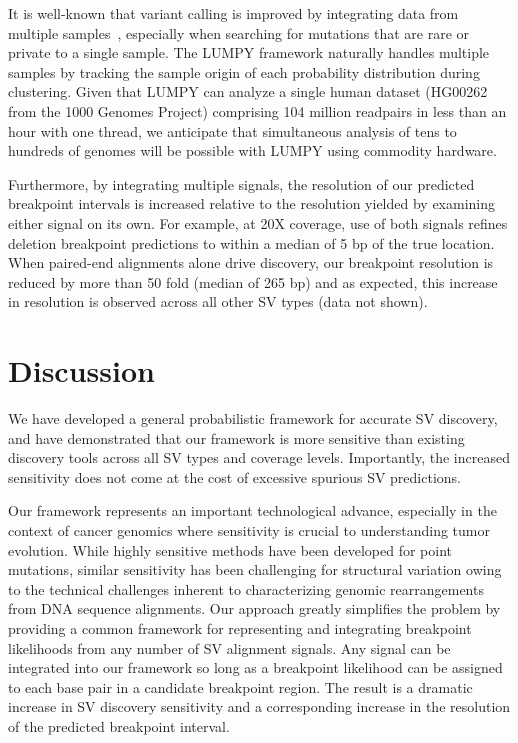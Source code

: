\documentclass[10pt]{bmc_article}
\newenvironment{bmcformat}{\begin{raggedright}\baselineskip20pt\sloppy\setboolean{publ}{false}}{\end{raggedright}\baselineskip20pt\sloppy}
\begin{document}
\begin{bmcformat}
It is well-known that variant calling is improved by integrating data from
multiple samples~\cite{handsaker2011, mckenna2010, hormozdiari2011,
quinlan2011}, especially when searching for mutations that are rare or private
to a single sample. The LUMPY framework naturally handles multiple samples by
tracking the sample origin of each probability distribution during clustering.
Given that LUMPY can analyze a single human dataset (HG00262 from the 1000
Genomes Project) comprising 104 million readpairs in less than an hour with one
thread, we anticipate that simultaneous analysis of tens to hundreds of genomes
will be possible with LUMPY using commodity hardware.

Furthermore, by integrating multiple signals, the resolution of our
predicted breakpoint intervals is increased relative to the resolution yielded
by examining either signal on its own. For example, at 20X coverage, use of both
signals refines deletion breakpoint predictions to within a median of 5 bp of
the true location. When paired-end alignments alone drive discovery, our
breakpoint resolution is reduced by more than 50 fold (median of 265 bp) and as
expected, this increase in resolution is observed across all other SV types
(data not shown).

\section*{Discussion}
We have developed a general probabilistic framework for accurate SV discovery,
and have demonstrated that our framework is more sensitive than existing
discovery tools across all SV types and coverage levels. Importantly, the
increased sensitivity does not come at the cost of excessive spurious SV
predictions.

Our framework represents an important technological advance, especially in the
context of cancer genomics where sensitivity is crucial to understanding tumor
evolution. While highly sensitive methods have been developed for point
mutations, similar sensitivity has been challenging for structural variation
owing to the technical challenges inherent to characterizing genomic
rearrangements from DNA sequence alignments. Our approach greatly simplifies the
problem by providing a common framework for representing and integrating
breakpoint likelihoods from any number of SV alignment signals. Any signal can
be integrated into our framework so long as a breakpoint likelihood can be
assigned to each base pair in a candidate breakpoint region. The result is a
dramatic increase in SV discovery sensitivity and a corresponding increase in
the resolution of the predicted breakpoint interval.


\end{bmcformat}
\end{document}
